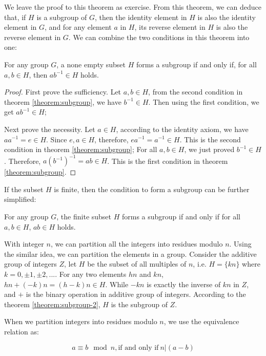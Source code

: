 \documentclass{article}
\begin{document}
We leave the proof to this theorem as exercise. From this theorem, we can deduce that, if $H$ is a subgroup of $G$, then the identity element in $H$ is also the identity element in $G$, and for any element $a$ in $H$, its reverse element in $H$ is also the reverse element in $G$. We can combine the two conditions in this theorem into one:

\begin{theorem}
For any group $G$, a none empty subset $H$ forms a subgroup if and only if, for all $a, b \in H$, then $ab^{-1} \in H$ holds.
\label{theorem:subgroup-2}
\end{theorem}

\begin{proof}
First prove the sufficiency. Let $a, b \in H$, from the second condition in theorem \ref{theorem:subgroup}, we have $b^{-1} \in H$. Then using the first condition, we get $ab^{-1} \in H$;

Next prove the necessity. Let $a \in H$, according to the identity axiom, we have $aa^{-1} = e \in H$. Since $e, a \in H$, therefore, $ea^{-1} = a^{-1} \in H$. This is the second condition in theorem \ref{theorem:subgroup}; For all $a, b \in H$, we just proved $b^{-1} \in H$. Therefore, $a(b^{-1})^{-1} = ab \in H$. This is the first condition in theorem \ref{theorem:subgroup}.
\end{proof}

If the subset $H$ is finite, then the condition to form a subgroup can be further simplified:

\begin{theorem}
For any group $G$, the finite subset $H$ forms a subgroup if and only if for all $a, b \in H$, $ab \in H$ holds.
\end{theorem}

With integer $n$, we can partition all the integers into residues modulo $n$. Using the similar idea, we can partition the elements in a group. Consider the additive group of integers $Z$, let $H$ be the subset of all multiples of $n$, i.e. $H = \{ kn \}$ where $k = 0, \pm 1, \pm 2, ...$. For any two elements $hn$ and $kn$, $hn + (-k)n = (h - k)n \in H$. While $-kn$ is exactly the inverse of $kn$ in $Z$, and $+$ is the binary operation in additive group of integers. According to the theorem \ref{theorem:subgroup-2}, $H$ is the subgroup of $Z$.

When we partition integers into residues modulo $n$, we use the equivalence relation as:

\[
a \equiv b \mod n, \text{if and only if}\ n | (a - b)
\]
\end{document}
